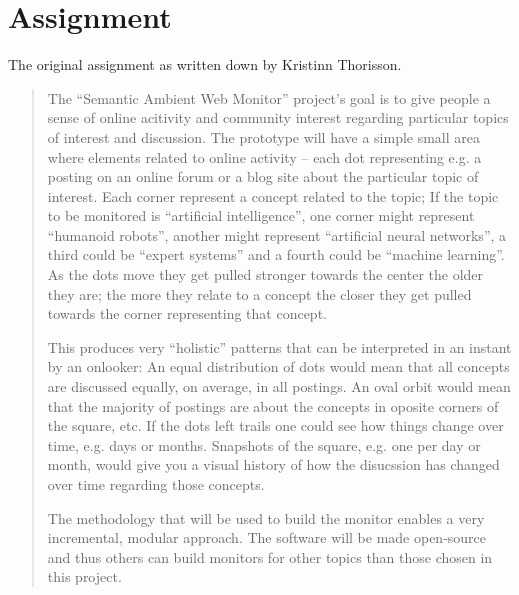 \chapter{\label{cpt:assignment}Assignment}

The original assignment as written down by Kristinn Thorisson.

\begin{quote}

  The ``Semantic Ambient Web Monitor'' project's goal is to give people a sense
  of online acitivity and community interest regarding particular topics of
  interest and discussion. The prototype will have a simple small area where
  elements related to online activity -- each dot representing e.g. a posting
  on an online forum or a blog site about the particular topic of interest.
  Each corner represent a concept related to the topic; If the topic to be
  monitored is ``artificial intelligence'', one corner might represent
  ``humanoid robots'', another might represent ``artificial neural networks'',
  a third could be ``expert systems'' and a fourth could be ``machine
  learning''. As the dots move they get pulled stronger towards the center the
  older they are; the more they relate to a concept the closer they get pulled
  towards the corner representing that concept.

  This produces very ``holistic'' patterns that can be interpreted in an
  instant by an onlooker: An equal distribution of dots would mean that all
  concepts are discussed equally, on average, in all postings. An oval orbit
  would mean that the majority of postings are about the concepts in oposite
  corners of the square, etc. If the dots left trails one could see how things
  change over time, e.g. days or months. Snapshots of the square, e.g. one per
  day or month, would give you a visual history of how the disucssion has
  changed over time regarding those concepts.

  The methodology that will be used to build the monitor enables a very
  incremental, modular approach. The software will be made open-source and thus
  others can build monitors for other topics than those chosen in this project.

\end{quote}


